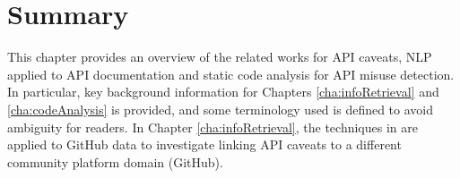 \section{Summary}
This chapter provides an overview of the related works for API caveats, NLP applied to API documentation and static code analysis for API misuse detection. In particular, key background information for Chapters \ref{cha:infoRetrieval} and \ref{cha:codeAnalysis} is provided, and some terminology used is defined to avoid ambiguity for readers. In Chapter \ref{cha:infoRetrieval}, the techniques in \cite{jiamou} are applied to GitHub data to investigate linking API caveats to a different community platform domain (GitHub).


